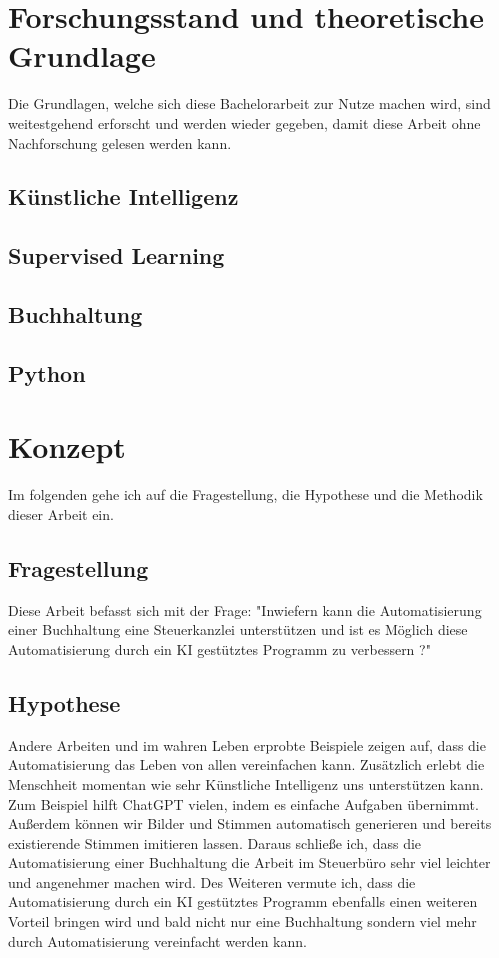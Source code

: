 \documentclass[hidelinks,12pt,a4paper]{article}
\begin{document}
\section{Forschungsstand und theoretische Grundlage}
Die Grundlagen, welche sich diese Bachelorarbeit zur Nutze machen wird, sind weitestgehend erforscht und werden wieder gegeben, damit diese Arbeit ohne Nachforschung gelesen werden kann. 

\subsection{Künstliche Intelligenz}


\subsection{Supervised Learning}

\subsection{Buchhaltung}

\subsection{Python}

\newpage
\section{Konzept}
Im folgenden gehe ich auf die Fragestellung, die Hypothese und die Methodik dieser Arbeit ein. 

\subsection{Fragestellung}
Diese Arbeit befasst sich mit der Frage: "Inwiefern kann die Automatisierung einer Buchhaltung eine Steuerkanzlei unterstützen und ist es Möglich diese Automatisierung durch ein KI gestütztes Programm zu verbessern ?"

\subsection{Hypothese}
Andere Arbeiten und im wahren Leben erprobte Beispiele zeigen auf, dass die Automatisierung das Leben von allen vereinfachen kann. Zusätzlich erlebt die Menschheit momentan wie sehr Künstliche Intelligenz uns unterstützen kann. Zum Beispiel hilft ChatGPT vielen, indem es einfache Aufgaben übernimmt. Außerdem können wir Bilder und Stimmen automatisch generieren und bereits existierende Stimmen imitieren lassen. 
\newline 
Daraus schließe ich, dass die Automatisierung einer Buchhaltung die Arbeit im Steuerbüro sehr viel leichter und angenehmer machen wird. Des Weiteren vermute ich, dass die Automatisierung durch ein KI gestütztes Programm ebenfalls einen weiteren Vorteil bringen wird und bald nicht nur eine Buchhaltung sondern viel mehr durch Automatisierung vereinfacht werden kann. 
\end{document}
